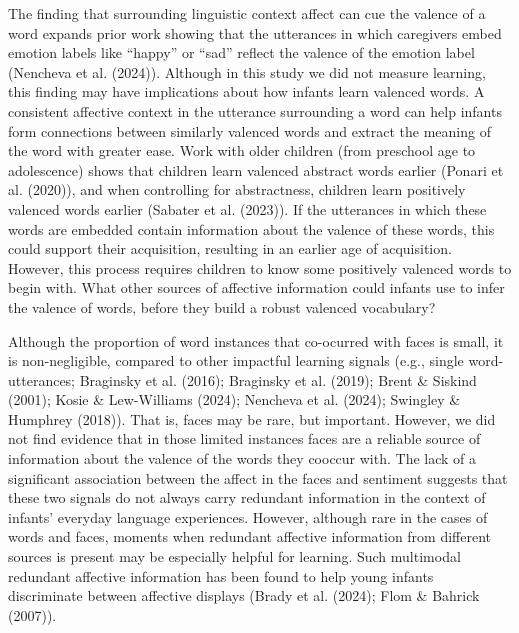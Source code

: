 \documentclass[10pt, letterpaper]{article}
\begin{document}
The finding that surrounding linguistic context affect can cue the
valence of a word expands prior work showing that the utterances in
which caregivers embed emotion labels like ``happy'' or ``sad'' reflect
the valence of the emotion label (Nencheva et al. (2024)). Although in
this study we did not measure learning, this finding may have
implications about how infants learn valenced words. A consistent
affective context in the utterance surrounding a word can help infants
form connections between similarly valenced words and extract the
meaning of the word with greater ease. Work with older children (from
preschool age to adolescence) shows that children learn valenced
abstract words earlier (Ponari et al. (2020)), and when controlling for
abstractness, children learn positively valenced words earlier (Sabater
et al. (2023)). If the utterances in which these words are embedded
contain information about the valence of these words, this could support
their acquisition, resulting in an earlier age of acquisition. However,
this process requires children to know some positively valenced words to
begin with. What other sources of affective information could infants
use to infer the valence of words, before they build a robust valenced
vocabulary?

Although the proportion of word instances that co-ocurred with faces is
small, it is non-negligible, compared to other impactful learning
signals (e.g., single word-utterances; Braginsky et al. (2016);
Braginsky et al. (2019); Brent \& Siskind (2001); Kosie \& Lew-Williams
(2024); Nencheva et al. (2024); Swingley \& Humphrey (2018)). That is,
faces may be rare, but important. However, we did not find evidence that
in those limited instances faces are a reliable source of information
about the valence of the words they cooccur with. The lack of a
significant association between the affect in the faces and sentiment
suggests that these two signals do not always carry redundant
information in the context of infants' everyday language experiences.
However, although rare in the cases of words and faces, moments when
redundant affective information from different sources is present may be
especially helpful for learning. Such multimodal redundant affective
information has been found to help young infants discriminate between
affective displays (Brady et al. (2024); Flom \& Bahrick (2007)).
\end{document}
